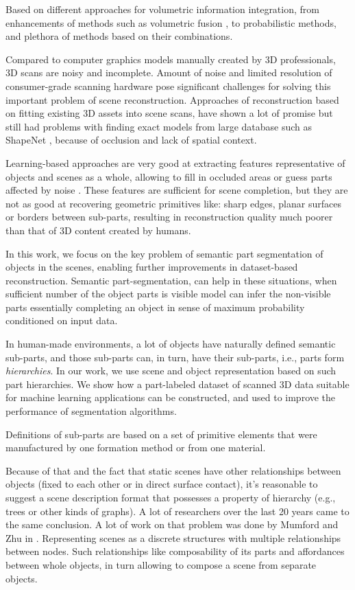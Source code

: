 Based on different approaches for volumetric information integration, from enhancements of  methods such as volumetric fusion \cite{curless1996volumetric}, to probabilistic  methods, and plethora of methods based on their combinations.

Compared to computer graphics models manually created by 3D professionals, 3D scans are noisy and incomplete.
Amount of noise and limited resolution of consumer-grade scanning hardware pose significant challenges for solving this important problem of scene reconstruction. 
Approaches of reconstruction based on fitting existing 3D assets into scene scans, have shown a lot of promise but still had problems with finding exact models from large database such as ShapeNet \cite{chang2015shapenet}, because of occlusion and lack of spatial context.

Learning-based approaches are very good at extracting features representative of objects and scenes as a whole, allowing to fill in occluded areas or guess parts affected by noise \cite{dai2017shape,dai2018scancomplete,song2017semantic}. These features are sufficient for scene completion, but they are not as good at recovering geometric primitives like: sharp edges, planar surfaces or borders between sub-parts, resulting in reconstruction quality much poorer than that of 3D content created by humans.

In this work, we focus on the key problem of semantic part segmentation of objects in the scenes, enabling further improvements in  dataset-based reconstruction. 
Semantic part-segmentation, can help in these situations, when sufficient number of the object parts is visible model can infer the non-visible parts essentially completing an object in sense of maximum probability conditioned on input data.

In human-made environments, a lot of objects have naturally defined semantic sub-parts, and those sub-parts can, in turn, have their sub-parts, i.e., parts form \emph{hierarchies}.  In our work, we use scene and object representation based on such part hierarchies.  We show how a part-labeled dataset of scanned 3D data suitable for machine learning applications can be constructed, and used to improve the performance of segmentation algorithms. 

Definitions of sub-parts are based on a set of primitive elements that were manufactured by one formation method or from one material.

Because of that and the fact that static scenes have other relationships between objects (fixed to each other or in direct surface contact), it's reasonable to suggest a scene description format that possesses a property of hierarchy (e.g., trees or other kinds of graphs).
A lot of researchers over the last 20 years came to the same conclusion. A lot of work on that problem was done by Mumford and Zhu in \cite{zhu2006stochastic}.
Representing scenes as a discrete structures with multiple relationships between nodes. Such relationships like composability of its parts and affordances between whole objects, in turn allowing to compose a scene from separate objects.

